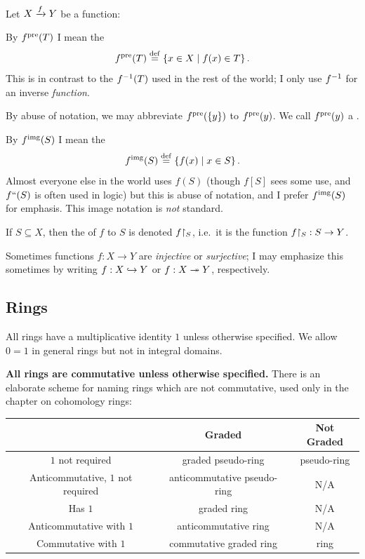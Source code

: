 Let $X \xrightarrow{f} Y$ be a function:
\begin{itemize}
\ii By $f^{\text{pre}}(T)$ I mean the 
\[ f^{\text{pre}}(T) \overset{\mathrm{def}}{=} \left\{ x \in X \mid f(x) \in T \right\}.  \]
This is in contrast to the $f^{-1}(T)$ used in the rest of the world;
I only use $f^{-1}$ for an inverse \emph{function}.

By abuse of notation, we may abbreviate $f^{\text{pre}}(\{y\})$ to $f^{\text{pre}}(y)$.
We call $f^{\text{pre}}(y)$ a .

\ii By $f^{\text{img}}(S)$ I mean the 
\[ f^{\text{img}}(S) \overset{\mathrm{def}}{=} \left\{ f(x) \mid x \in S \right\}. \]
Almost everyone else in the world uses $f(S)$
(though $f[S]$ sees some use, and $f``(S)$ is often used in logic)
but this is abuse of notation,
and I prefer $f^{\text{img}}(S)$ for emphasis.
This image notation is \emph{not} standard.

\ii If $S \subseteq X$, then the  of $f$ to $S$
is denoted $f \restrict{S}$,
i.e.\ it is the function $f \restrict{S} : S \to Y$.

\ii Sometimes functions $f : X \to Y$ are \emph{injective} or \emph{surjective};
I may emphasize this sometimes by writing $f : X \hookrightarrow Y$ or $f : X \twoheadrightarrow Y$, respectively.
\end{itemize}

\subsection*{Rings}
All rings have a multiplicative identity $1$ unless otherwise specified.
We allow $0=1$ in general rings but not in integral domains.

\textbf{All rings are commutative unless otherwise specified.}
There is an elaborate scheme for naming rings which are not commutative,
used only in the chapter on cohomology rings:

\begin{center}
	\small
	\begin{tabular}[h]{|c|cc|}
		\hline
		& Graded & Not Graded \\ \hline
		$1$ not required & graded pseudo-ring & pseudo-ring \\
		Anticommutative, $1$ not required & anticommutative pseudo-ring & N/A \\
		Has $1$ & graded ring & N/A \\
		Anticommutative with $1$ & anticommutative ring & N/A \\ 
		Commutative with $1$ & commutative graded ring & ring \\ \hline
	\end{tabular}
\end{center}

